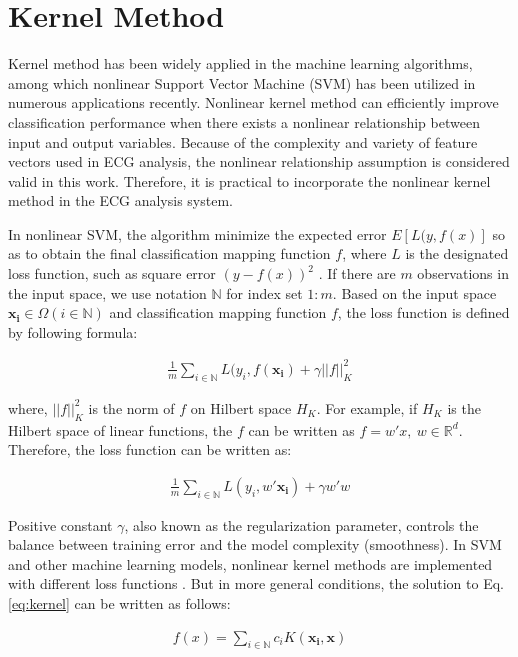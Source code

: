 \section{Kernel Method}

Kernel method has been widely applied in the machine learning algorithms, among which nonlinear Support Vector Machine (SVM) has been utilized in numerous applications recently\cite{shawe2004kernel}. Nonlinear kernel method can efficiently improve classification performance when there exists a nonlinear relationship between input and output variables. Because of the complexity and variety of feature vectors used in ECG analysis, the nonlinear relationship assumption is considered valid in this work. Therefore, it is practical to incorporate the nonlinear kernel method in the ECG analysis system.


In nonlinear SVM, the algorithm  minimize the expected error $E[L(y,f(x)]$ so as to obtain the final classification mapping function $f$, where $L$ is the designated loss function, such as square error $(y-f(x))^2$ \cite{scholkopf1999advances}. If there are $m$ observations in the input space, we use notation $\mathbb{N}$ for index set ${1:m}$. Based on the input space $\mathbf{x_i}\in \Omega (i\in \mathbb{N})$ and classification mapping function $f$, the loss function is defined by following formula:

\begin{align}
    \frac{1}{m}\sum_{i\in \mathbb{N}}L(y_i,f(\mathbf{x_i}) + \gamma||f||_K^2
\end{align}

where, $||f||_K^2$ is the norm of $f$ on Hilbert space $H_K$. For example, if $H_K$ is the Hilbert space of linear functions, the $f$ can be written as $f=w' x,~w\in\mathbb{R}^d$. Therefore, the loss function can be written as:

\begin{align}
    \frac{1}{m}\sum_{i\in \mathbb{N}}L(y_i,w'\mathbf{x_i}) + \gamma w'w
    \label{eq:kernel}
\end{align}

Positive constant $\gamma$, also known as the regularization parameter, controls the balance between training error and the model complexity (smoothness). In SVM and other machine learning models, nonlinear kernel methods are implemented with different loss functions \cite{evgeniou2000regularization}. But in more general conditions, the solution to Eq.\ref{eq:kernel} can be written as follows: 

\begin{align}
    f(x)=\sum_{i\in \mathbb{N}}c_i K(\mathbf{x_i},\mathbf{x} )
    \label{eq:kernel2}
\end{align}

